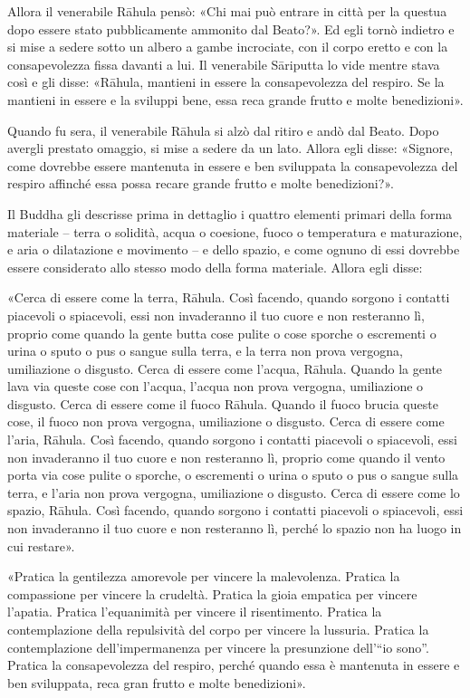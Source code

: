 Allora il venerabile Rāhula pensò: «Chi mai può entrare in città per la
questua dopo essere stato pubblicamente ammonito dal Beato?». Ed egli
tornò indietro e si mise a sedere sotto un albero a gambe incrociate,
con il corpo eretto e con la consapevolezza fissa davanti a lui. Il
venerabile Sāriputta lo vide mentre stava così e gli disse: «Rāhula,
mantieni in essere la consapevolezza del respiro. Se la mantieni in
essere e la sviluppi bene, essa reca grande frutto e molte benedizioni».


Quando fu sera, il venerabile Rāhula si alzò dal ritiro e andò dal
Beato. Dopo avergli prestato omaggio, si mise a sedere da un lato.
Allora egli disse: «Signore, come dovrebbe essere mantenuta in essere e
ben sviluppata la consapevolezza del respiro affinché essa possa recare
grande frutto e molte benedizioni?».




 Il Buddha gli descrisse prima in dettaglio i quattro
elementi primari della forma materiale – terra o solidità, acqua o
coesione, fuoco o temperatura e maturazione, e aria o dilatazione e
movimento – e dello spazio, e come ognuno di essi dovrebbe essere
considerato allo stesso modo della forma materiale. Allora egli disse:


 «Cerca di essere come la terra, Rāhula. Così facendo, quando
sorgono i contatti piacevoli o spiacevoli, essi non invaderanno il tuo
cuore e non resteranno lì, proprio come quando la gente butta cose
pulite o cose sporche o escrementi o urina o sputo o pus o sangue sulla
terra, e la terra non prova vergogna, umiliazione o disgusto. Cerca di
essere come l’acqua, Rāhula. Quando la gente lava via queste cose con
l’acqua, l’acqua non prova vergogna, umiliazione o disgusto. Cerca di
essere come il fuoco Rāhula. Quando il fuoco brucia queste cose, il
fuoco non prova vergogna, umiliazione o disgusto. Cerca di essere come
l’aria, Rāhula. Così facendo, quando sorgono i contatti piacevoli o
spiacevoli, essi non invaderanno il tuo cuore e non resteranno lì,
proprio come quando il vento porta via cose pulite o sporche, o
escrementi o urina o sputo o pus o sangue sulla terra, e l’aria non
prova vergogna, umiliazione o disgusto. Cerca di essere come lo spazio,
Rāhula. Così facendo, quando sorgono i contatti piacevoli o spiacevoli,
essi non invaderanno il tuo cuore e non resteranno lì, perché lo spazio
non ha luogo in cui restare».


«Pratica la gentilezza amorevole per vincere la malevolenza. Pratica la
compassione per vincere la crudeltà. Pratica la gioia empatica per
vincere l’apatia. Pratica l’equanimità per vincere il risentimento.
Pratica la contemplazione della repulsività del corpo per vincere la
lussuria. Pratica la contemplazione dell’impermanenza per vincere la
presunzione dell’“io sono”. Pratica la consapevolezza del respiro,
perché quando essa è mantenuta in essere e ben sviluppata, reca gran
frutto e molte benedizioni».


